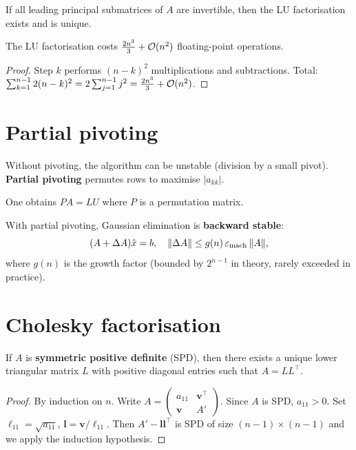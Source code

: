 \begin{theorem}[Existence of LU]
If all leading principal submatrices of $A$ are invertible, then the LU factorisation exists and is unique.
\end{theorem}

\begin{theorem}[Cost]
The LU factorisation costs $\frac{2n^3}{3}+\mathcal{O}(n^2)$ floating-point operations.
\end{theorem}

\begin{proof}
Step $k$ performs $(n-k)^2$ multiplications and subtractions. Total: $\sum_{k=1}^{n-1}2(n-k)^2=2\sum_{j=1}^{n-1}j^2=\frac{2n^3}{3}+\mathcal{O}(n^2)$.
\end{proof}

\section{Partial pivoting}

\begin{warning}
Without pivoting, the algorithm can be unstable (division by a small pivot). \textbf{Partial pivoting} permutes rows to maximise $|a_{kk}|$.
\end{warning}

One obtains $PA=LU$ where $P$ is a permutation matrix.

\begin{theorem}[Stability]
With partial pivoting, Gaussian elimination is \textbf{backward stable}:
\[
(A+\Delta A)\hat{x}=b, \quad \|\Delta A\|\leq g(n)\,\varepsilon_{\mathrm{mach}}\,\|A\|,
\]
where $g(n)$ is the growth factor (bounded by $2^{n-1}$ in theory, rarely exceeded in practice).
\end{theorem}

\section{Cholesky factorisation}

\begin{theorem}
If $A$ is \textbf{symmetric positive definite} (SPD), then there exists a unique lower triangular matrix $L$ with positive diagonal entries such that $A=LL^\top$.
\end{theorem}

\begin{proof}
By induction on $n$. Write $A=\begin{pmatrix}a_{11}&\mathbf{v}^\top\\\mathbf{v}&A'\end{pmatrix}$. Since $A$ is SPD, $a_{11}>0$. Set $\ell_{11}=\sqrt{a_{11}}$, $\mathbf{l}=\mathbf{v}/\ell_{11}$. Then $A'- \mathbf{l}\mathbf{l}^\top$ is SPD of size $(n-1)\times(n-1)$ and we apply the induction hypothesis.
\end{proof}

